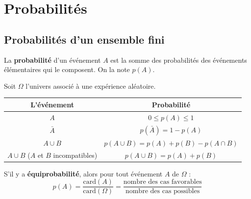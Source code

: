
\chapter{Probabilit\'{e}s}

\section{Probabilit\'{e}s d'un ensemble fini}

\begin{definition}
La \textbf{probabilit\'{e}} d'un \'{e}v\'{e}nement $A$ est la somme des probabilit\'{e}s
des \'{e}v\'{e}nements \'{e}l\'{e}mentaires qui le composent. On la note $p(A)$.
\end{definition}

\begin{propriete}
Soit $\Omega$ l'univers associ\'{e} \`{a} une exp\'{e}rience al\'{e}atoire.

\medskip
\begin{center}
\renewcommand{\arraystretch}{1.5}
\begin{tabular}{|c|c|}
  \hline
  \rowcolor{forestlight}
  \textbf{\color{forest}L'\'{e}v\'{e}nement} & \textbf{\color{forest}Probabilit\'{e}} \\
  \hline
  $A$ & $0 \leq p(A) \leq 1$ \\
  \hline
  $\bar{A}$ & $p(\bar{A}) = 1 - p(A)$ \\
  \hline
  $A \cup B$ & $p(A \cup B) = p(A) + p(B) - p(A \cap B)$ \\
  \hline
  $A \cup B$ \quad ($A$ et $B$ incompatibles) & $p(A \cup B) = p(A) + p(B)$ \\
  \hline
\end{tabular}
\end{center}
\end{propriete}

\begin{theoreme}[Equiprobabilit\'{e}]
S'il y a \textbf{\'{e}quiprobabilit\'{e}}, alors pour tout \'{e}v\'{e}nement $A$ de $\Omega$ :
\[
  p(A) = \frac{\mathrm{card}(A)}{\mathrm{card}(\Omega)}
       = \frac{\text{nombre des cas favorables}}{\text{nombre des cas possibles}}
\]
\end{theoreme}

